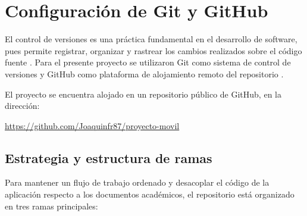 
\section{Configuraci\'on de Git y GitHub}

El control de versiones es una pr\'actica fundamental en el desarrollo de
software, pues permite registrar, organizar y rastrear los cambios realizados
sobre el c\'odigo fuente \citep{gitdocs}. Para el presente proyecto se
utilizaron Git como sistema de control de versiones y GitHub como plataforma de
alojamiento remoto del repositorio \citep{githubdocs}.

El proyecto se encuentra alojado en un repositorio p\'ublico de GitHub, en la
direcci\'on:

\begin{center}
  \url{https://github.com/Joaquinfr87/proyecto-movil}
\end{center}

\subsection{Estrategia y estructura de ramas}

Para mantener un flujo de trabajo ordenado y desacoplar el c\'odigo de la
aplicaci\'on respecto a los documentos acad\'emicos, el repositorio est\'a
organizado en tres ramas principales:

\begin{table}[H]
  \centering
  \caption{Estructura de ramas del repositorio en GitHub}
  \label{tab:ramas-repositorio}
\end{table}

